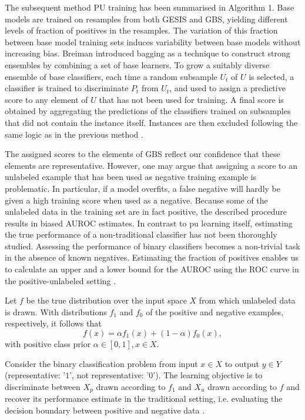 \newpage
The subsequent method PU training has been summarised in Algorithm 1. Base models are trained on resamples from both GESIS and GBS, yielding diﬀerent levels of fraction of positives in the resamples. The variation of this fraction between base model training sets induces variability between base models without increasing bias. Breiman \cite{leo} introduced bagging as a technique to construct strong ensembles by combining a set of base learners. To grow a suitably diverse ensemble of base classiﬁers, each time a random subsample \(U_t\) of \(U\) is selected, a classiﬁer is trained to discriminate \(P_t\) from \(U_t\), and used to assign a predictive score to any element of \(U\) that has not been used for training. A final score is obtained by aggregating the predictions of the classiﬁers trained on subsamples that did not contain the instance itself. Instances are then excluded following the same logic as in the previous method \cite{claesen2, jain2}.

The assigned scores to the elements of GBS reflect our confidence that these elements are representative. However, one may argue that assigning a score to an unlabeled example that has been used as negative training example is problematic. In particular, if a model overfits, a false negative will hardly be given a high training score when used as a negative. Because some of the unlabeled data in the training set are in fact positive, the described procedure results in biased AUROC estimates. In contrast to pu learning itself, estimating the true performance of a non-traditional classifier has not been thoroughly studied. Assessing the performance of binary classifiers becomes a non-trivial task in the absence of known negatives. Estimating the fraction of positives enables us to calculate an upper and a lower bound for the AUROC using the ROC curve in the positive-unlabeled setting \cite{claesen2, jain, jain2}.

Let \(f\) be the true distribution over the input space \(X\) from which unlabeled data is drawn. With distributions \(f_1\) and \(f_0\) of the positive and negative examples, respectively, it follows that \[f(x) = \alpha f_1(x) + (1-\alpha)f_0(x),\] with positive class prior \(\alpha \in [0,1], x \in X\).

Consider the binary classification problem from input \(x \in X\) to output \(y \in Y\) (representative: '\(1\)', not representative: '\(0\)'). The learning objective is to discriminate between \(X_p\) drawn according to \(f_1\) and \(X_u\) drawn according to \(f\)  and recover its performance estimate in the traditional setting, i.e. evaluating the decision boundary between positive and negative data \cite{jain}.

